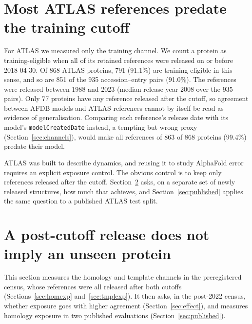 \documentclass{article}
\begin{document}
\section{Most ATLAS references predate the training cutoff}
\label{sec:atlas}

For ATLAS we measured only the training channel. We count a protein as
training-eligible when all of its retained references were released on or before
2018-04-30. Of 868 ATLAS proteins, 791 (91.1\%) are training-eligible in
this sense, and so are 851 of the 935 accession--entry pairs (91.0\%). The
references were released between 1988 and 2023 (median release year 2008
over the 935 pairs). Only 77
proteins have any reference released after the cutoff, so agreement between
AFDB models and ATLAS references cannot by itself be read as evidence of
generalisation. Comparing each reference's release date with its model's
\texttt{modelCreatedDate} instead, a tempting but wrong proxy
(Section~\ref{sec:channels}), would make all references of 863 of 868
proteins (99.4\%) predate their model.

ATLAS was built to describe dynamics, and reusing it to study AlphaFold
error requires an explicit exposure control. The obvious control is to keep
only references released after the cutoff. Section~\ref{sec:homology} asks,
on a separate set of newly released structures, how much that achieves, and
Section~\ref{sec:published} applies the same question to a published ATLAS
test split.

\section{A post-cutoff release does not imply an unseen protein}
\label{sec:homology}

This section measures the homology and template channels in the
preregistered census, whose references were all released after both
cutoffs (Sections~\ref{sec:homexp} and~\ref{sec:tmplexp}). It then asks, in
the post-2022 census, whether exposure goes with higher agreement
(Section~\ref{sec:effect}), and measures homology exposure in two published
evaluations (Section~\ref{sec:published}).
\end{document}

